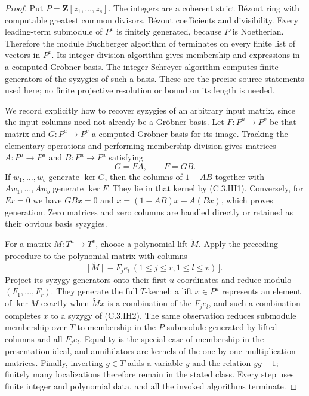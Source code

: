 \begin{proof}
Put $P=\mathbf Z[z_1,\ldots,z_s]$.
The integers are a coherent strict B\'ezout ring with computable greatest
common divisors, B\'ezout coefficients and divisibility.
Every leading-term submodule of $P^v$ is finitely generated, because $P$ is
Noetherian.  Therefore the module Buchberger algorithm of
\cite[Theorem 4.6 and Algorithm 2.5]{C-GLNY2020} terminates on every finite
list of vectors in $P^v$.  Its integer division algorithm gives membership
and expressions in a computed Gr\"obner basis.  The integer Schreyer
algorithm \cite[Theorem 6.5 and Algorithm 2.8]{C-GLNY2020} computes finite
generators of the syzygies of such a basis.  These are the precise source
statements used here; no finite projective resolution or bound on its
length is needed.

We record explicitly how to recover syzygies of an arbitrary input matrix,
since the input columns need not already be a Gr\"obner basis.
Let $F:P^u\to P^v$ be that matrix and $G:P^a\to P^v$ a computed
Gr\"obner basis for its image.
Tracking the elementary operations and performing membership division gives
matrices $A:P^a\to P^u$ and $B:P^u\to P^a$ satisfying
\[
                     G=FA,\qquad F=GB.                 \tag{C.3.IH1}
\]
If $w_1,\ldots,w_b$ generate $\ker G$, then the columns of $1-AB$
together with $Aw_1,\ldots,Aw_b$ generate $\ker F$.
They lie in that kernel by (C.3.IH1).  Conversely, for $Fx=0$ we have
$GBx=0$ and
$x=(1-AB)x+A(Bx)$, which proves generation.
Zero matrices and zero columns are handled directly or retained as their
obvious basis syzygies.

For a matrix $M:T^u\to T^v$, choose a polynomial lift $\widetilde M$.
Apply the preceding procedure to the polynomial matrix with columns
\[
 \bigl[\,\widetilde M\ \big|\ -F_j e_l\ (1\leq j\leq r,
                                     1\leq l\leq v)\,\bigr].       \tag{C.3.IH2}
\]
Project its syzygy generators onto their first $u$ coordinates and reduce
modulo $(F_1,\ldots,F_r)$.
They generate the full $T$-kernel: a lift $x\in P^u$ represents an element
of $\ker M$ exactly when $\widetilde Mx$ is a combination of the
$F_j e_l$, and such a combination completes $x$ to a syzygy of (C.3.IH2).
The same observation reduces submodule membership over $T$ to membership
in the $P$-submodule generated by lifted columns and all $F_j e_l$.
Equality is the special case of membership in the presentation ideal,
and annihilators are kernels of the one-by-one multiplication matrices.
Finally, inverting $g\in T$ adds a variable $y$ and the relation $yg-1$;
finitely many localizations therefore remain in the stated class.
Every step uses finite integer and polynomial data, and all the invoked
algorithms terminate.
\end{proof}


